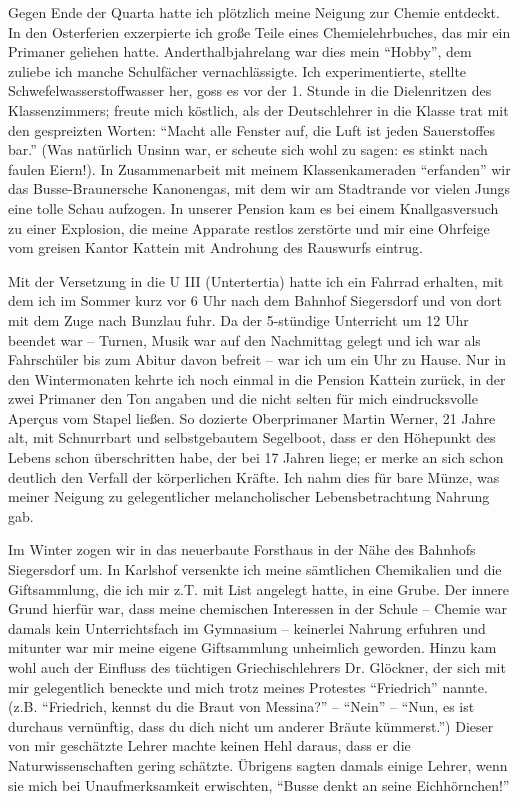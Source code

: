 Gegen Ende der Quarta hatte ich plötzlich meine Neigung zur Chemie entdeckt. In den Osterferien exzerpierte ich große Teile eines Chemielehrbuches, das mir ein Primaner geliehen hatte. Anderthalbjahrelang war dies mein \enquote{Hobby}, dem zuliebe ich manche Schulfächer vernachlässigte. Ich experimentierte, stellte Schwefelwasserstoffwasser her, goss es vor der 1. Stunde in die Dielenritzen des Klassenzimmers; freute mich köstlich, als der Deutschlehrer in die Klasse trat mit den gespreizten Worten: \enquote{Macht alle Fenster auf, die Luft ist jeden Sauerstoffes bar.} (Was natürlich Unsinn war, er scheute sich wohl zu sagen: es stinkt nach faulen Eiern!). In Zusammenarbeit mit meinem Klassenkameraden \enquote{erfanden} wir das Busse-Braunersche Kanonengas, mit dem wir am Stadtrande vor vielen Jungs eine tolle Schau aufzogen. In unserer Pension kam es bei einem Knallgasversuch zu einer Explosion, die meine Apparate restlos zerstörte und mir eine Ohrfeige vom greisen Kantor Kattein mit Androhung des Rauswurfs eintrug.

Mit der Versetzung in die U III (Untertertia) hatte ich ein Fahrrad erhalten, mit dem ich im Sommer kurz vor 6 Uhr nach dem Bahnhof Siegersdorf und von dort mit dem Zuge nach Bunzlau fuhr. Da der 5-stündige Unterricht um 12 Uhr beendet war -- Turnen, Musik war auf den Nachmittag gelegt und ich war als Fahrschüler bis zum Abitur davon befreit -- war ich um ein Uhr zu Hause. Nur in den Wintermonaten kehrte ich noch einmal in die Pension Kattein zurück, in der zwei Primaner den Ton angaben und die nicht selten für mich eindrucksvolle Aperçus vom Stapel ließen. So dozierte Oberprimaner Martin Werner, 21 Jahre alt, mit Schnurrbart und selbstgebautem Segelboot, dass er den Höhepunkt des Lebens schon überschritten habe, der bei 17 Jahren liege; er merke an sich schon deutlich den Verfall der körperlichen Kräfte. Ich nahm dies für bare Münze, was meiner Neigung zu gelegentlicher melancholischer Lebensbetrachtung Nahrung gab.

Im Winter zogen wir in das neuerbaute Forsthaus in der Nähe des Bahnhofs Siegersdorf um. In Karlshof versenkte ich meine sämtlichen Chemikalien und die Giftsammlung, die ich mir z.T. mit List angelegt hatte, in eine Grube. Der innere Grund hierfür war, dass meine chemischen Interessen in der Schule -- Chemie war damals kein Unterrichtsfach im Gymnasium -- keinerlei Nahrung erfuhren und mitunter war mir meine eigene Giftsammlung unheimlich geworden. Hinzu kam wohl auch der Einfluss des tüchtigen Griechischlehrers Dr. Glöckner, der sich mit mir gelegentlich beneckte und mich trotz meines Protestes \enquote{Friedrich} nannte. (z.B. \enquote{Friedrich, kennst du die Braut von Messina?} -- \enquote{Nein} -- \enquote{Nun, es ist durchaus vernünftig, dass du dich nicht um anderer Bräute kümmerst.}) Dieser von mir geschätzte Lehrer machte keinen Hehl daraus, dass er die Naturwissenschaften gering schätzte. Übrigens sagten damals einige Lehrer, wenn sie mich bei Unaufmerksamkeit erwischten, \enquote{Busse denkt an seine Eichhörnchen!}

